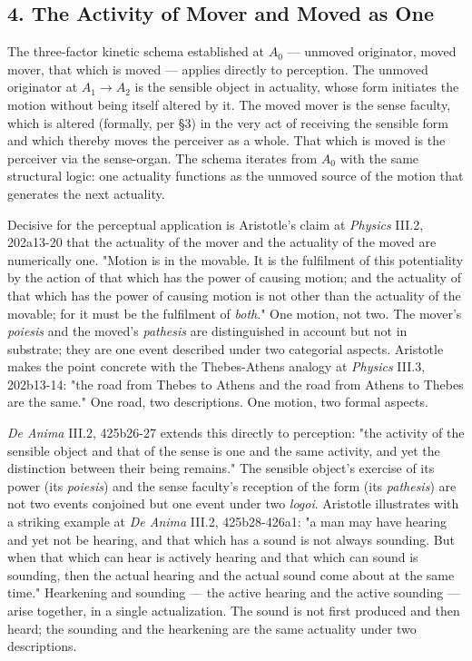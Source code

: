 \documentclass[12pt]{article}
\begin{document}
\subsection*{4. The Activity of Mover and Moved as One}

The three-factor kinetic schema established at $A_0$ --- unmoved originator, moved mover, that which is moved --- applies directly to perception. The unmoved originator at $A_1$$\to$$A_2$ is the sensible object in actuality, whose form initiates the motion without being itself altered by it. The moved mover is the sense faculty, which is altered (formally, per §3) in the very act of receiving the sensible form and which thereby moves the perceiver as a whole. That which is moved is the perceiver via the sense-organ. The schema iterates from $A_0$ with the same structural logic: one actuality functions as the unmoved source of the motion that generates the next actuality.

Decisive for the perceptual application is Aristotle's claim at \textit{Physics} III.2, 202a13-20 that the actuality of the mover and the actuality of the moved are numerically one. "Motion is in the movable. It is the fulfilment of this potentiality by the action of that which has the power of causing motion; and the actuality of that which has the power of causing motion is not other than the actuality of the movable; for it must be the fulfilment of \textit{both}." One motion, not two. The mover's \textit{poiesis} and the moved's \textit{pathesis} are distinguished in account but not in substrate; they are one event described under two categorial aspects. Aristotle makes the point concrete with the Thebes-Athens analogy at \textit{Physics} III.3, 202b13-14: "the road from Thebes to Athens and the road from Athens to Thebes are the same." One road, two descriptions. One motion, two formal aspects.

\textit{De Anima} III.2, 425b26-27 extends this directly to perception: "the activity of the sensible object and that of the sense is one and the same activity, and yet the distinction between their being remains." The sensible object's exercise of its power (its \textit{poiesis}) and the sense faculty's reception of the form (its \textit{pathesis}) are not two events conjoined but one event under two \textit{logoi}. Aristotle illustrates with a striking example at \textit{De Anima} III.2, 425b28-426a1: "a man may have hearing and yet not be hearing, and that which has a sound is not always sounding. But when that which can hear is actively hearing and that which can sound is sounding, then the actual hearing and the actual sound come about at the same time." Hearkening and sounding --- the active hearing and the active sounding --- arise together, in a single actualization. The sound is not first produced and then heard; the sounding and the hearkening are the same actuality under two descriptions.
\end{document}
